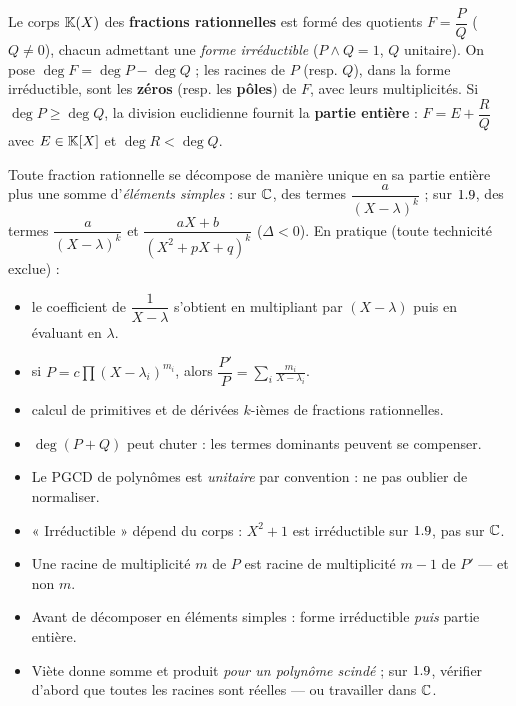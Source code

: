 
\begin{definition}
Le corps $\mathbb{K}(X)$ des \textbf{fractions rationnelles} est formé des
quotients $F=\dfrac{P}{Q}$ ($Q\neq0$), chacun admettant une \emph{forme
irréductible} ($P\wedge Q=1$, $Q$ unitaire). On pose
$\deg F=\deg P-\deg Q$ ; les racines de $P$ (resp. $Q$), dans la forme
irréductible, sont les \textbf{zéros} (resp. les \textbf{pôles}) de $F$,
avec leurs multiplicités. Si $\deg P\geq\deg Q$, la division euclidienne
fournit la \textbf{partie entière} : $F=E+\dfrac{R}{Q}$ avec $E\in\mathbb{K}[X]$
et $\deg R<\deg Q$.
\end{definition}

\begin{theoreme}
Toute fraction rationnelle se décompose de manière unique en sa partie
entière plus une somme d'\emph{éléments simples} :
sur $\mathbb{C}$, des termes $\dfrac{a}{(X-\lambda)^{k}}$ ; sur $1.9$, des termes
$\dfrac{a}{(X-\lambda)^{k}}$ et
$\dfrac{aX+b}{(X^{2}+pX+q)^{k}}$ ($\Delta<0$). En pratique (toute
technicité exclue) :
\begin{itemize}[label={\color{otNavy}\textbullet},leftmargin=1.4em,itemsep=0.6mm,topsep=0.8mm]
  \item {} le coefficient de $\dfrac{1}{X-\lambda}$
    s'obtient en multipliant par $(X-\lambda)$ puis en évaluant en
    $\lambda$.
  \item {} si
    $P=c\prod(X-\lambda_i)^{m_i}$, alors
    $\dfrac{P'}{P}=\displaystyle\sum_i\frac{m_i}{X-\lambda_i}$.
  \item {} calcul de primitives et de dérivées
    $k$-ièmes de fractions rationnelles.
\end{itemize}
\end{theoreme}

\begin{attention}
\begin{itemize}[label={\color{otOrange}\textbullet},leftmargin=1.4em,itemsep=0.6mm,topsep=0.5mm]
  \item $\deg(P+Q)$ peut chuter : les termes dominants peuvent se
    compenser.
  \item Le PGCD de polynômes est \emph{unitaire} par convention : ne pas
    oublier de normaliser.
  \item « Irréductible » dépend du corps : $X^{2}+1$ est irréductible sur
    $1.9$, pas sur $\mathbb{C}$.
  \item Une racine de multiplicité $m$ de $P$ est racine de multiplicité
    $m-1$ de $P'$ — et non $m$.
  \item Avant de décomposer en éléments simples : forme irréductible
    \emph{puis} partie entière.
  \item Viète donne somme et produit \emph{pour un polynôme scindé} ; sur
    $1.9$, vérifier d'abord que toutes les racines sont réelles — ou
    travailler dans $\mathbb{C}$.
\end{itemize}
\end{attention}

